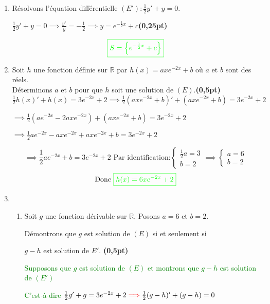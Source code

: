 \documentclass[12pt]{article}
\begin{document}
\renewcommand{\labelenumi}{\theenumi)}
\begin{enumerate}[label=\arabic*)]
    \item Résolvons l'équation différentielle \( (E'):\frac{1}{2}y'+y=0 \).
    
		    \( \frac{1}{2}y'+y=0 \implies \frac{y'}{y}=-\frac{1}{2} \implies y=e^{-\frac{1}{2}x}+c\)\hfill \textbf{(0,25pt)}
    
    	   			\[\textcolor{green}{\boxed{S= \left\lbrace e^{-\frac{1}{2}x}+c \right\rbrace  }}\]
    	   			
    \item Soit $h$ une fonction définie sur $\mathbb{R}$ par $h(x)=axe^{-2x}+b$ où $a$ et $b$ sont  des réels.\\
        Déterminons $a$ et $b$ pour que $h$ soit une solution de $(E).$\hfill \textbf{(0,5pt)}
        \( \frac{1}{2}h(x)'+h(x)=3e^{-2x}+2 \implies \frac{1}{2}(axe^{-2x}+b)'+(axe^{-2x}+b)=3e^{-2x}+2 \)
        
        \( \implies \frac{1}{2}(ae^{-2x}-2axe^{-2x})+(axe^{-2x}+b)=3e^{-2x}+2 \)
        
        \( \implies \frac{1}{2}ae^{-2x}-axe^{-2x}+axe^{-2x}+b=3e^{-2x}+2 \)
        
        \[ 
        \implies \frac{1}{2}ae^{-2x}+b=3e^{-2x}+2\text{ Par identification:}
        \begin{cases}
        \frac{1}{2}a=3\\
        b=2
        \end{cases}\implies
        \begin{cases}
         a=6\\
         b=2
        \end{cases}
        \]
\[\text{Donc } \textcolor{green}{\boxed{h(x)=6xe^{-2x}+2}} \]
    \item
    \begin{enumerate}[label=\alph*)]
       \item Soit $g$ une fonction dérivable sur $\mathbb{R}.$ Posons $a=6$ et $b=2.$
       
        Démontrons que $g$ est solution de $(E)$ si et seulement si
        
         \( g-h \) est solution  de \( E' \). \hfill \textbf{(0,5pt)}
         
         \textcolor{green}{Supposons que \( g \) est solution de \( (E) \) et montrons que \( g-h \) est solution de \( (E') \) }
         
	   \textcolor{green}{C'est-à-dire  \( \frac{1}{2}g'+g = 3e^{-2x}+2  \textcolor{red}{\implies} \frac{1}{2}(g-h)'+(g-h)=0\)}       
	   

\end{enumerate}
\end{enumerate}
\end{document}
